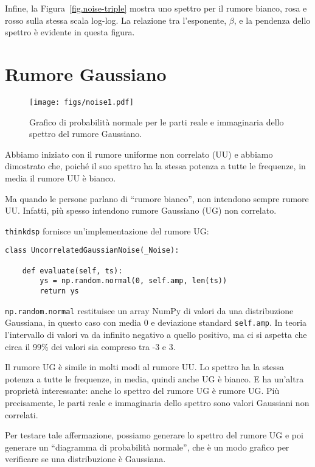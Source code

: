 \documentclass[12pt]{book} \usepackage[width=5.5in,height=8.5in, hmarginratio=3:2,vmarginratio=1:1]{geometry}
\begin{document}
Infine, la Figura~\ref{fig.noise-triple} mostra uno spettro per il rumore bianco, rosa e rosso sulla stessa scala log-log. La relazione tra l'esponente, $\beta$, e la pendenza dello spettro è evidente in questa figura.

\section{Rumore Gaussiano} 

\begin{figure} 

\centerline{\texttt{[image: figs/noise1.pdf]}} \caption{Grafico di probabilità normale per le parti reale e immaginaria dello spettro del rumore Gaussiano.} \label{fig.noise1} \end{figure} 

Abbiamo iniziato con il rumore uniforme non correlato (UU) e abbiamo dimostrato che, poiché il suo spettro ha la stessa potenza a tutte le frequenze, in media il rumore UU è bianco.

Ma quando le persone parlano di ``rumore bianco'', non intendono sempre rumore UU. Infatti, più spesso intendono rumore Gaussiano (UG) non correlato.

{\tt thinkdsp} fornisce un'implementazione del rumore UG:

\begin{verbatim} 
class UncorrelatedGaussianNoise(_Noise):

    def evaluate(self, ts):
        ys = np.random.normal(0, self.amp, len(ts))
        return ys
 \end{verbatim} 

{\tt np.random.normal} restituisce un array NumPy di valori da una distribuzione Gaussiana, in questo caso con media 0 e deviazione standard {\tt self.amp}. In teoria l'intervallo di valori va da infinito negativo a quello positivo, ma ci si aspetta che circa il 99\% dei valori sia compreso tra -3 e 3.

Il rumore UG è simile in molti modi al rumore UU. Lo spettro ha la stessa potenza a tutte le frequenze, in media, quindi anche UG è bianco. E ha un'altra proprietà interessante: anche lo spettro del rumore UG è rumore UG. Più precisamente, le parti reale e immaginaria dello spettro sono valori Gaussiani non correlati.

Per testare tale affermazione, possiamo generare lo spettro del rumore UG e poi generare un ``diagramma di probabilità normale'', che è un modo grafico per verificare se una distribuzione è Gaussiana.
\end{document}

